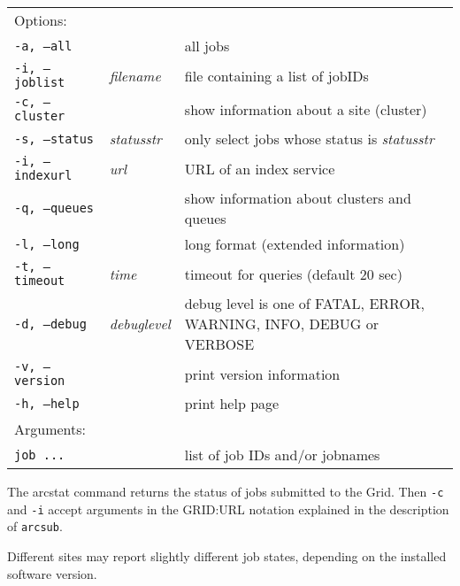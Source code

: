 \begin{shaded}
\end{shaded}
\begin{longtable}{llp{8cm}}
   Options:&&\\
   \texttt{-a, --all}& & all jobs\\
   \texttt{-i, --joblist}& \textit{filename}& file containing a list of jobIDs\\
   \texttt{-c, --cluster}& & show information about a site (cluster)\\
   \texttt{-s, --status}& \textit{statusstr} &only select jobs whose status is \textit{statusstr}\\
   \texttt{-i, --indexurl}& \textit{url} &URL of an index service\\
   \texttt{-q, --queues}&&show information about clusters and queues\\
   \texttt{-l, --long}& & long format (extended information)\\
   \texttt{-t, --timeout}& \textit{time}& timeout for queries (default 20 sec)\\
   \texttt{-d, --debug}& \textit{debuglevel}&debug level is one of  FATAL, ERROR, WARNING, INFO, DEBUG or VERBOSE\\
   \texttt{-v, --version}& & print version information\\
   \texttt{-h, --help}& & print help page\\
   Arguments:&&\\
   \texttt{job ...} && list of job IDs and/or jobnames\\
\end{longtable}

The arcstat command returns the status of jobs submitted to the Grid. Then \texttt{-c} and \texttt{-i} accept arguments in the GRID:URL notation explained in the description of \texttt{arcsub}.

Different sites may report slightly different job states, depending on
the installed software version.%


